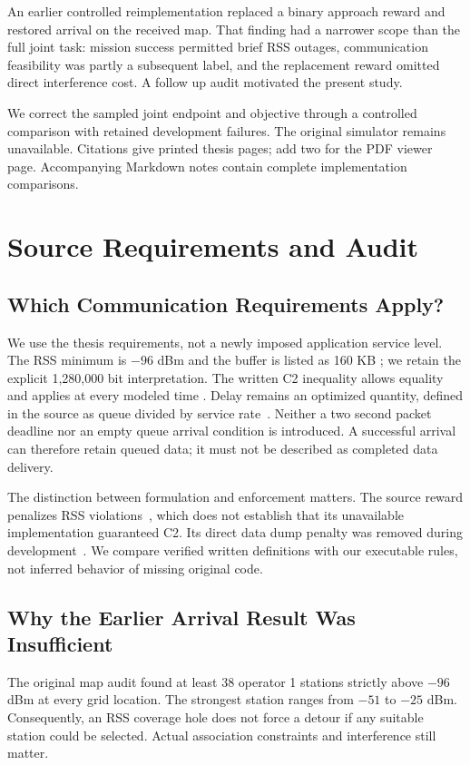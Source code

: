 \documentclass[conference]{IEEEtran}
\begin{document}
An earlier controlled reimplementation replaced a binary approach reward and
restored arrival on the received map. That finding had a narrower scope than
the full joint task: mission success permitted brief RSS outages, communication
feasibility was partly a subsequent label, and the replacement reward omitted
direct interference cost. A follow up audit motivated the present study.

We correct the sampled joint endpoint and objective through a controlled
comparison with retained development failures. The original simulator remains
unavailable. Citations give printed thesis pages; add two for the PDF viewer
page. Accompanying Markdown notes contain complete implementation comparisons.

\section{Source Requirements and Audit}
\subsection{Which Communication Requirements Apply?}
We use the thesis requirements, not a newly imposed application service level.
The RSS minimum is $-96$ dBm and the buffer is listed as 160 KB
\cite[p.~15, Table~3]{thesis}; we retain the explicit 1,280,000 bit interpretation.
The written C2 inequality allows equality and applies at every modeled time
\cite[p.~11, Eq.~(12)]{thesis}. Delay remains an optimized quantity, defined in
the source as queue divided by service rate~\cite[p.~9, Eq.~(4)]{thesis}.
Neither a two second packet deadline nor an empty queue arrival condition is
introduced. A successful arrival can therefore retain queued data; it must not
be described as completed data delivery.

The distinction between formulation and enforcement matters. The source reward
penalizes RSS violations~\cite[p.~12, Eq.~(14)]{thesis}, which does not establish
that its unavailable implementation guaranteed C2. Its direct data dump penalty
was removed during development~\cite[pp.~20--21, Sec.~7.3]{thesis}. We compare
verified written definitions with our executable rules, not inferred behavior
of missing original code.

\subsection{Why the Earlier Arrival Result Was Insufficient}
The original map audit found at least 38 operator 1 stations strictly above
$-96$ dBm at every grid location. The strongest station ranges from $-51$ to
$-25$ dBm. Consequently, an RSS coverage hole does not force a detour if any
suitable station could be selected. Actual association constraints and
interference still matter.
\end{document}

